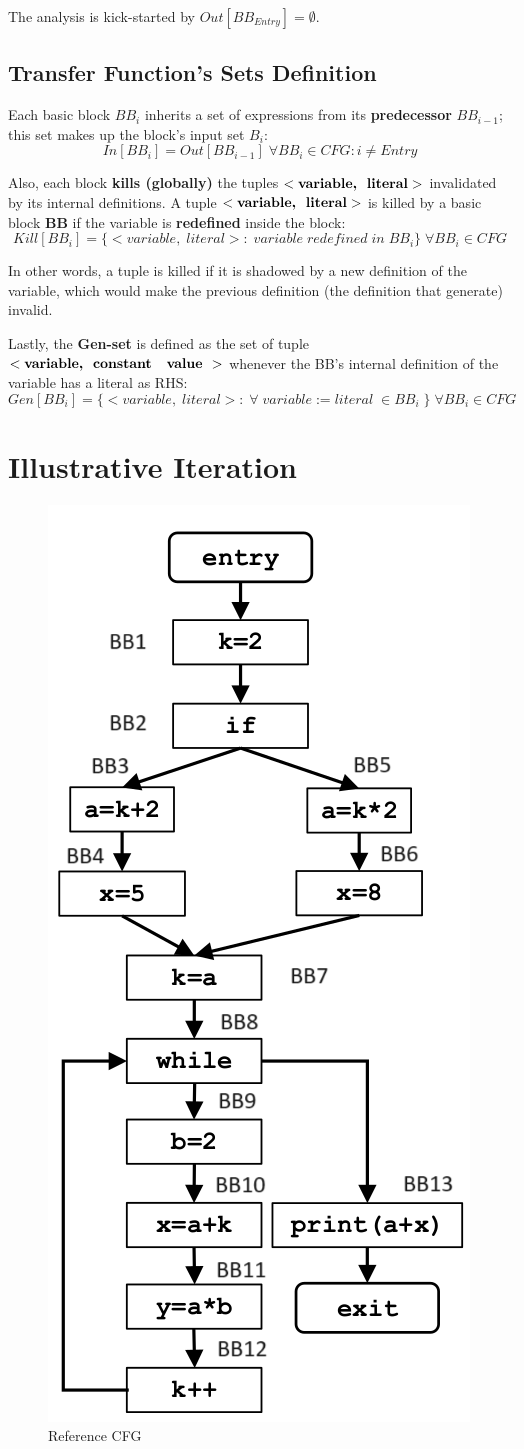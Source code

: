 \documentclass[a4paper,12pt,numbers=noenddot]{scrreprt}
\begin{document}
        The analysis is kick-started by $Out[BB_{Entry}] = \emptyset$.
        
    \subsection*{Transfer Function's Sets Definition}

        Each basic block $BB_i$ inherits a set of expressions from its \textbf{predecessor} $BB_{i-1}$; this set makes up the block's input set $B_i$: $$In[BB_i] = Out[BB_{i-1}] \; \forall BB_i \in CFG : i \neq Entry$$
        
        Also, each block \textbf{kills (globally)} the tuples $<\textbf{variable,\; literal}>$ invalidated by its internal definitions. A tuple $<\textbf{variable,\; literal}>$ is killed by a basic block \textbf{BB} if the variable is \textbf{redefined} inside the block: $$Kill[BB_i] = \{ <variable,\; literal> : \; variable \; redefined \; in\; BB_i\} \; \forall BB_i \in CFG$$

        In other words, a tuple is killed if it is shadowed by a new definition of the variable, which would make the previous definition (the definition that generate) invalid.

        Lastly, the \textbf{Gen-set} is defined as the set of tuple $<\textbf{variable,\; constant \; value }>$ whenever the BB's internal definition of the variable has a literal as RHS:
        $$Gen[BB_i] = \{ <variable,\; literal > : \; \forall \;variable := literal\; \in BB_i\;\} \; \forall BB_i \in CFG$$
        
    \section*{Illustrative Iteration}

        \begin{figure}[H]
            \centering
            \includegraphics[width=0.3\linewidth]{assets/cp.png}
            \caption{Reference CFG}
            \label{fig:cp_iteration_image}
        \end{figure}
        
\end{document}
